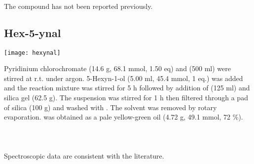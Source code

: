 \\[1\baselineskip]
\\[1\baselineskip]
\\[1\baselineskip]
The compound has not been reported previously.

\subsection{Hex-5-ynal }


\begin{scheme}[H]
	\begin{center}
		\texttt{[image: hexynal]}
	\end{center}
\end{scheme}

Pyridinium chlorochromate (14.6 g, 68.1 mmol, 1.50 eq) and  (500 ml) were stirred at r.t. under argon. 5-Hexyn-1-ol  (5.00 ml, 45.4 mmol, 1 eq.) was added and the reaction mixture was stirred for 5 h followed by addition of  (125 ml) and silica gel (62.5 g). The suspension was stirred for 1 h then filtered through a pad of silica (100 g) and washed with . The solvent was removed by rotary evaporation.  was obtained as a pale yellow-green oil (4.72 g, 49.1 mmol, 72 \%).
\\[1\baselineskip]
\\[1\baselineskip]
\\[1\baselineskip]
\\[1\baselineskip]
Spectroscopic data are consistent with the literature\cite{Kocsis2012}.

